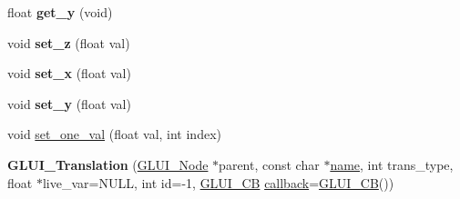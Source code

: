 \begin{DoxyCompactItemize}
\item 
\hypertarget{classGLUI__Translation_aa2863477d762d4a29a7b19ef3454a3bb}{float {\bfseries get\-\_\-y} (void)}\label{classGLUI__Translation_aa2863477d762d4a29a7b19ef3454a3bb}

\item 
\hypertarget{classGLUI__Translation_aa82c90797ca5cd0f6a79233693398e15}{void {\bfseries set\-\_\-z} (float val)}\label{classGLUI__Translation_aa82c90797ca5cd0f6a79233693398e15}

\item 
\hypertarget{classGLUI__Translation_acf59403020d9552c9be4afe774ad59a4}{void {\bfseries set\-\_\-x} (float val)}\label{classGLUI__Translation_acf59403020d9552c9be4afe774ad59a4}

\item 
\hypertarget{classGLUI__Translation_ae6eed14a15be75c89bdd91b1cd9c3ead}{void {\bfseries set\-\_\-y} (float val)}\label{classGLUI__Translation_ae6eed14a15be75c89bdd91b1cd9c3ead}

\item 
void \hyperlink{classGLUI__Translation_a8da9c19319e63bccbbe1b3c4b7cc1982}{set\-\_\-one\-\_\-val} (float val, int index)
\item 
\hypertarget{classGLUI__Translation_a078dd021e5c4870e901d459d6dd0ec9a}{{\bfseries G\-L\-U\-I\-\_\-\-Translation} (\hyperlink{classGLUI__Node}{G\-L\-U\-I\-\_\-\-Node} $\ast$parent, const char $\ast$\hyperlink{classGLUI__Control_aa95b97d50df45335fc33f0af03958eb3}{name}, int trans\-\_\-type, float $\ast$live\-\_\-var=N\-U\-L\-L, int id=-\/1, \hyperlink{classGLUI__CB}{G\-L\-U\-I\-\_\-\-C\-B} \hyperlink{classGLUI__Control_a96060fe0cc6d537e736dd6eef78e24ab}{callback}=\hyperlink{classGLUI__CB}{G\-L\-U\-I\-\_\-\-C\-B}())}\label{classGLUI__Translation_a078dd021e5c4870e901d459d6dd0ec9a}

\end{DoxyCompactItemize}
